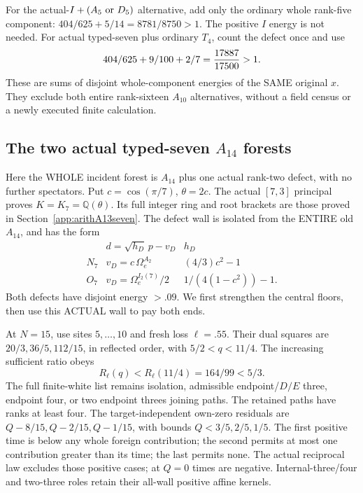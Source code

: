 For the actual-\(I+(A_5\hbox{ or }D_5)\)
alternative, add only the ordinary whole
rank-five component:
\(404/625+5/14=8781/8750>1\).
The positive \(I\) energy is not needed.
For actual typed-seven plus ordinary \(T_4\),
count the defect once and use
\[
                  404/625+9/100+2/7
                         ={17887\over17500}>1 .
\]
These are sums of disjoint whole-component
energies of the SAME original \(x\).
They exclude both entire rank-sixteen
\(A_{10}\) alternatives, without a field
census or a newly executed finite calculation.

\subsection{The two actual typed-seven \(A_{14}\) forests}
\label{app:arithA14typed}

Here the WHOLE incident forest is \(A_{14}\)
plus one actual rank-two defect, with no
further spectators.
Put \(c=\cos(\pi/7)\), \(\theta=2c\).
The actual \([7,3]\) principal proves
\(K=K_7=\mathbb Q(\theta)\).
Its full integer ring and root brackets
are those proved in
Section~\ref{app:arithA13seven}.
The defect wall is isolated from the ENTIRE
old \(A_{14}\), and has the form
\[
 \begin{array}{c|c|c}
 &d=\sqrt{h_D}\,p-v_D&h_D\\ \hline
 N_7&v_D=c\,\Omega_e^{A_2}&(4/3)c^2-1\\
 O_7&v_D=\Omega_e^{I_2(7)}/2&
                       1/(4(1-c^2))-1 .
 \end{array}
\]
Both defects have disjoint energy \(>.09\).
We first strengthen the central floors,
then use this ACTUAL wall to pay both ends.

At \(N=15\), use sites \(5,\ldots,10\)
and fresh loss \(\ell=.55\).
Their dual squares are \(20/3,36/5,112/15\),
in reflected order, with \(5/2<q<11/4\).
The increasing sufficient ratio obeys
\[
                R_\ell(q)<R_\ell(11/4)=164/99<5/3 .
\]
The full finite-white list remains isolation,
admissible endpoint/\(D/E\) three, endpoint
four, or two endpoint threes joining paths.
The retained paths have ranks at least four.
The target-independent own-zero residuals
are \(Q-8/15,Q-2/15,Q-1/15\), with bounds
\(Q<3/5,2/5,1/5\).
The first positive time is below any whole
foreign contribution; the second permits
at most one contribution greater than its
time; the last permits none.
The actual reciprocal law excludes those
positive cases; at \(Q=0\) times are negative.
Internal-three/four and two-three roles
retain their all-wall positive affine kernels.

